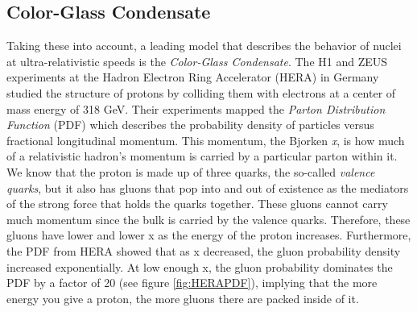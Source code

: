 \subsection{Color-Glass Condensate}
Taking these into account, a leading model that describes the behavior of nuclei at ultra-relativistic speeds is the \textit{Color-Glass Condensate}. The H1 and ZEUS experiments at the Hadron Electron Ring Accelerator (HERA) in Germany studied the structure of protons by colliding them with electrons at a center of mass energy of 318 GeV\citep{Abramowicz2015}. Their experiments mapped the \textit{Parton Distribution Function} (PDF) which describes the probability density of particles versus fractional longitudinal momentum. This momentum, the Bjorken \textit{x}, is how much of a relativistic hadron's momentum is carried by a particular parton within it. We know that the proton is made up of three quarks, the so-called \textit{valence quarks}, but it also has gluons that pop into and out of existence as the mediators of the strong force that holds the quarks together. These gluons cannot carry much momentum since the bulk is carried by the valence quarks. Therefore, these gluons have lower and lower x as the energy of the proton increases. Furthermore, the PDF from HERA showed that as x decreased, the gluon probability density increased exponentially. At low enough x, the gluon probability dominates the PDF by a factor of 20 (see figure \ref{fig:HERAPDF}), implying that the more energy you give a proton, the more gluons there are packed inside of it.

